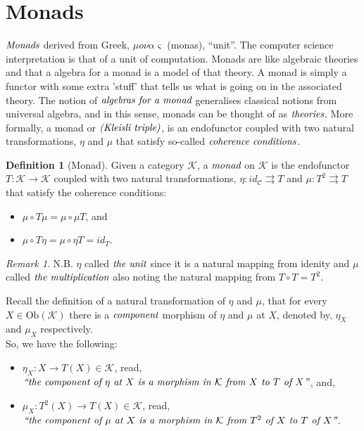 \documentclass[10pt, oneside, reqno]{amsart}
\theoremstyle{plain}%
\theoremstyle{definition}
\newtheorem{defn}[thm]{Definition}
\theoremstyle{remark}
\newtheorem*{rem}{Remark}
\newcommand{\Id}{\mathit{id}_}
\begin{document}
\section{Monads} %
\label{sec:monads}
$\emph{Monads}$ derived from Greek, $\mu o \nu\alpha\varsigma$ (monas), ``unit''.
The computer science interpretation is that of a unit of computation.
Monads are like algebraic theories and that a algebra for a monad is a model of that theory. A monad is simply a functor
with some extra 'stuff' that tells us what is going on in the associated theory.
The notion of $\emph{algebras for a monad}$ generalises classical notions from universal algebra,
and in this sense, monads can be thought of as $\emph{theories}$.
More formally, a monad or $\emph{(Kleisli triple)}$, is an endofunctor coupled with two natural transformations,
$\eta$ and $\mu$ that satisfy so-called $\emph{coherence conditions}$.

\begin{defn}[Monad]
 Given a category $\mathcal{K}$, a $\emph{monad}$ on $\mathcal{K}$ is the endofunctor $T: \mathcal{K} \to \mathcal{K}$
 coupled with two natural transformations, $\eta: \Id{\mathcal{C}} \rightrightarrows T$ and $\mu: T^2 \rightrightarrows T$
 that satisfy the coherence conditions:
 \begin{itemize}
  \item $\mu \circ T \mu = \mu \circ \mu T$, and
  \item $\mu \circ T \eta = \mu \circ \eta T = \Id{T}$.
 \end{itemize}
\end{defn}
\begin{rem}
 N.B. $\eta$ called $\emph{the unit}$ since it is a natural mapping from idenity and
 $\mu$ called $\emph{the multiplication}$ also noting the natural mapping from $T \circ T = T^2$.
\end{rem}

Recall the definition of a natural transformation of $\eta$ and $\mu$, that for every $X \in \text{Ob}(\mathcal{K})$
there is a $\emph{component}$ morphism of $\eta$ and $\mu$ at $X$, denoted by, $\eta_{X}$ and $\mu_{X}$ respectively.
\\
So, we have the following:
\begin{itemize}
 \item $\eta_{X}: X \to T(X) \in \mathcal{K}$,
 read, $\emph{``the component of $\eta$ at $X$ is a morphism in $\mathcal{K}$ from $X$ to $T$ of $X$''}$, and,
 \item $\mu_{X}: T^2(X) \to T(X) \in \mathcal{K}$,
 read, $\emph{``the component of $\mu$ at $X$ is a morphism in $\mathcal{K}$ from $T^2$ of $X$ to $T$ of $X$''}$.
\end{itemize}
\end{document}
